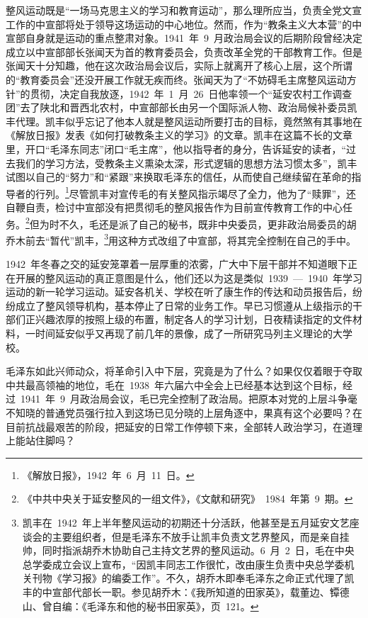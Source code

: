 整风运动既是“一场马克思主义的学习和教育运动”，那么理所应当，负责全党文宣工作的中宣部将处于领导这场运动的中心地位。然而，作为“教条主义大本营”的中宣部自身就是运动的重点整肃对象。1941~年~9~月政治局会议的后期阶段曾经决定成立以中宣部部长张闻天为首的教育委员会，负责改革全党的干部教育工作。但是张闻天十分知趣，他在这次政治局会议后，实际上就离开了核心上层，这个所谓的“教育委员会”还没开展工作就无疾而终。张闻天为了“不妨碍毛主席整风运动方针”的贯彻，决定自我放逐，1942~年~1~月~26~日他率领一个“延安农村工作调查团”去了陕北和晋西北农村，中宣部部长由另一个国际派人物、政治局候补委员凯丰代理。凯丰似乎忘记了他本人就是整风运动所要打击的目标，竟然煞有其事地在《解放日报》发表《如何打破教条主义的学习》的文章。凯丰在这篇不长的文章里，开口“毛泽东同志”闭口“毛主席”，他以指导者的身分，告诉延安的读者，“过去我们的学习方法，受教条主义熏染太深，形式逻辑的思想方法习惯太多”，凯丰试图以自己的“努力”和“紧跟”来换取毛泽东的信任，从而使自己继续留在革命的指导者的行列。\footnote{《解放日报》，1942~年~6~月~11~日。}尽管凯丰对宣传毛的有关整风指示竭尽了全力，他为了“赎罪”，还自鞭自责，检讨中宣部没有把贯彻毛的整风报告作为目前宣传教育工作的中心任务。\footnote{《中共中央关于延安整风的一组文件》，《文献和研究》~1984~年第~9~期。}但为时不久，毛还是派了自己的秘书，既非中央委员，更非政治局委员的胡乔木前去“暂代”凯丰，\footnote{凯丰在~1942~年上半年整风运动的初期还十分活跃，他甚至是五月延安文艺座谈会的主要组织者，但是毛泽东不放手让凯丰负责文艺界整风，而是亲自挂帅，同时指派胡乔木协助自己主持文艺界的整风运动。6~月~2~日，毛在中央总学委成立会议上宣布，“因凯丰同志工作很忙，改由康生负责中央总学委机关刊物《学习报》的编委工作”。不久，胡乔木即奉毛泽东之命正式代理了凯丰的中宣部代部长一职。参见胡乔木：《我所知道的田家英》，载董边、镡德山、曾自编：《毛泽东和他的秘书田家英》，页~121。}用这种方式改组了中宣部，将其完全控制在自己的手中。

1942~年冬春之交的延安笼罩着一层厚重的浓雾，广大中下层干部并不知道眼下正在开展的整风运动的真正意图是什么，他们还以为这是类似~1939~—~1940~年学习运动的新一轮学习运动。延安各机关、学校在听了康生作的传达和动员报告后，纷纷成立了整风领导机构，基本停止了日常的业务工作。早已习惯遵从上级指示的干部们正兴趣浓厚的按照上级的布置，制定各人的学习计划，日夜精读指定的文件材料，一时间延安似乎又再现了前几年的景像，成了一所研究马列主义理论的大学校。

毛泽东如此兴师动众，将革命引入中下层，究竟是为了什么？如果仅仅着眼于夺取中共最高领袖的地位，毛在~1938~年六届六中全会上已经基本达到这个目标，经过~1941~年~9~月政治局会议，毛已完全控制了政治局。把原本对党的上层斗争毫不知晓的普通党员强行拉入到这场已见分晓的上层角逐中，果真有这个必要吗？在目前抗战最艰苦的阶段，把延安的日常工作停顿下来，全部转人政治学习，在道理上能站住脚吗？

